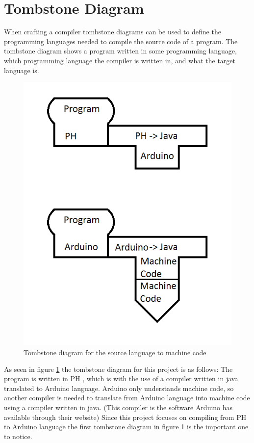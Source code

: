 \section{Tombstone Diagram}
When crafting a compiler tombstone diagrams can be used to define the programming languages needed to compile the source code of a program. The tombstone diagram shows a program written in some programming language, which programming language the compiler is written in, and what the target language is.

\begin{figure}[H]
	\centering
		\includegraphics{billeder/tombstone_diagram.png}
		\caption{Tombstone diagram for the source language to machine code}
		\label{fig:tombstone}
\end{figure}

As seen in figure \ref{fig:tombstone} the tombstone diagram for this project is as follows: The program is written in PH , which is with the use of a compiler written in java translated to Arduino language. Arduino only understands machine code, so another compiler is needed to translate from Arduino language into machine code using a compiler written in java. (This compiler is the software Arduino has available through their website)
Since this project focuses on compiling from PH to Arduino language the first tombstone diagram in figure \ref{fig:tombstone} is the important one to notice.